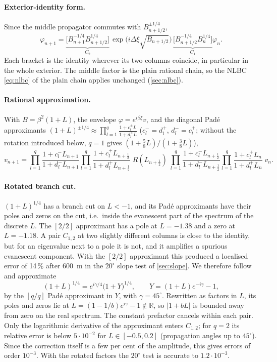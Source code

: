 \documentclass[11pt,a4paper]{article}
\theoremstyle{remark}
\begin{document}
\paragraph{Exterior-identity form.} Since the middle propagator commutes with
$B_{n+1/2}^{\pm1/4}$,
\begin{equation}\label{eq:flux_pairs}
\varphi_{n+1}=\underbrace{\bigl[B_{n+1}^{-1/4}B_{n+1/2}^{1/4}\bigr]}_{C_2}\,
\exp\bigl(i\Delta\xi\sqrt{B_{n+1/2}}\bigr)\,
\underbrace{\bigl[B_{n+1/2}^{-1/4}B_{n}^{1/4}\bigr]}_{C_1}\varphi_n .
\end{equation}
Each bracket is the identity wherever its two columns coincide, in particular in
the whole exterior. The middle factor is the plain rational chain, so the NLBC
\eqref{eq:nlbc} of the plain chain applies unchanged (\cref{sec:nlbc}).

\paragraph{Rational approximation.} With $B=\beta^2(1+L)$, the envelope
$\varphi=e^{i\beta\xi}v$, and the diagonal Pad\'e approximants
$(1+L)^{\pm1/4}\approx\prod_{l=1}^{q}\frac{1+c^\pm_lL}{1+d^\pm_lL}$
($c^-_l=d^+_l$, $d^-_l=c^+_l$; without the rotation introduced below, $q=1$ gives $(1+\frac58L)/(1+\frac38L)$),
\begin{equation}\label{eq:full_step}
v_{n+1}=\prod_{l=1}^{q}\frac{1+c^-_lL_{n+1}}{1+d^-_lL_{n+1}}\prod_{l=1}^{q}\frac{1+c^+_lL_{n+\frac12}}{1+d^+_lL_{n+\frac12}}\;
R(L_{n+\frac12})\;
\prod_{l=1}^{q}\frac{1+c^-_lL_{n+\frac12}}{1+d^-_lL_{n+\frac12}}\prod_{l=1}^{q}\frac{1+c^+_lL_{n}}{1+d^+_lL_{n}}\;v_n .
\end{equation}
\paragraph{Rotated branch cut.} $(1+L)^{1/4}$ has a branch cut on $L<-1$, and its
Pad\'e approximants have their poles and zeros on the cut, i.e.\ inside the
evanescent part of the spectrum of the discrete $L$. The $[2/2]$ approximant
has a pole at $L=-1.38$ and a zero at $L=-1.18$. A pair $C_{1,2}$ at two slightly
different columns is close to the identity, but for an eigenvalue next to a
pole it is not, and it amplifies a spurious evanescent component. With the
$[2/2]$ approximant this produced a localised error of 14\,\% after
\SI{600}{m} in the $20^\circ$ slope test of \cref{sec:slope}. We therefore follow
\cite{milinazzo1997} and approximate
\[
(1+L)^{1/4}=e^{i\gamma/4}\bigl(1+Y\bigr)^{1/4},\qquad Y=(1+L)e^{-i\gamma}-1,
\]
by the $[q/q]$ Pad\'e approximant in $Y$, with $\gamma=45^\circ$. Rewritten as
factors in $L$, its poles and zeros lie at
$L=(1-1/b)e^{i\gamma}-1\notin\mathbb R$, so $|1+bL|$ is bounded away from zero on
the real spectrum. The constant prefactor cancels within each pair. Only the
logarithmic derivative of the approximant enters $C_{1,2}$; for $q=2$ its
relative error is below $5\cdot10^{-2}$ for $L\in[-0.5,0.2]$ (propagation angles up
to $45^\circ$). Since the correction itself is a few per cent of the amplitude,
this gives errors of order $10^{-3}$. With the rotated factors the $20^\circ$
test is accurate to $1.2\cdot10^{-3}$.
\end{document}
